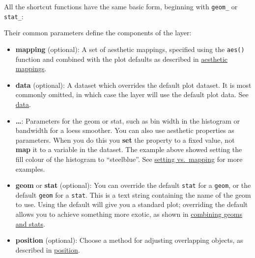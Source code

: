 \begin{Shaded}
\begin{Highlighting}[]
\NormalTok{(} \NormalTok{, } \NormalTok{)}
\end{Highlighting}
\end{Shaded}

\noindent All the shortcut functions have the same basic form, beginning
with \texttt{geom\_} or \texttt{stat\_}:

\begin{Shaded}
\begin{Highlighting}[]
\end{Highlighting}
\end{Shaded}

\noindent Their common parameters define the components of the layer:

\begin{itemize}
\item
  \textbf{mapping} (optional): A set of aesthetic mappings, specified
  using the \texttt{aes()} function and combined with the plot defaults
  as described in \hyperref[sec:aes]{aesthetic mappings}.
\item
  \textbf{data} (optional): A dataset which overrides the default plot
  dataset. It is most commonly omitted, in which case the layer will use
  the default plot data. See \hyperref[sec:data]{data}.
\item
  \textbf{\ldots{}}: Parameters for the geom or stat, such as bin width
  in the histogram or bandwidth for a loess smoother. You can also use
  aesthetic properties as parameters. When you do this you \textbf{set}
  the property to a fixed value, not \textbf{map} it to a variable in
  the dataset. The example above showed setting the fill colour of the
  histogram to ``steelblue''. See \hyperref[sub:setting-mapping]{setting
  vs.~mapping} for more examples.
\item
  \textbf{geom} or \textbf{stat} (optional): You can override the
  default \texttt{stat} for a \texttt{geom}, or the default
  \texttt{geom} for a \texttt{stat}. This is a text string containing
  the name of the geom to use. Using the default will give you a
  standard plot; overriding the default allows you to achieve something
  more exotic, as shown in \hyperref[sub:new-plot-types]{combining geoms
  and stats}.
\item
  \textbf{position} (optional): Choose a method for adjusting
  overlapping objects, as described in
  \hyperref[sec:position]{position}.
\end{itemize}

